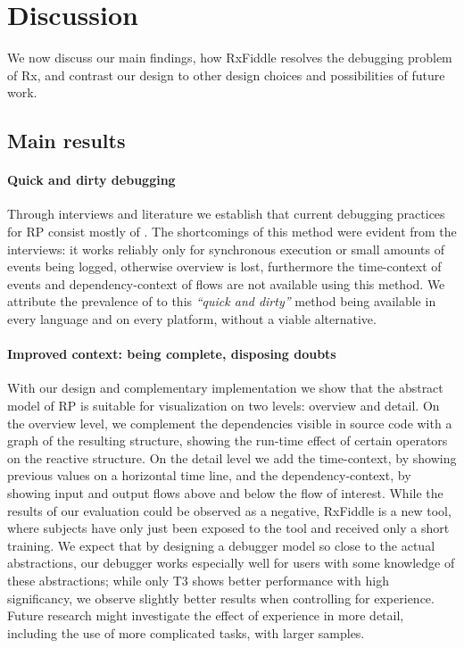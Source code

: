 \section{Discussion}
We now discuss our main findings, how RxFiddle resolves the debugging problem of Rx, and contrast our design to other design choices and possibilities of future work.

\subsection{Main results}
\paragraph{Quick and dirty debugging} Through interviews and literature we establish that current debugging practices for RP consist mostly of \printfdebugging{}. The shortcomings of this method were evident from the interviews: it works reliably only for synchronous execution or small amounts of events being logged, otherwise overview is lost, furthermore the time-context of events and dependency-context of flows are not available using this method. We attribute the prevalence of \printfdebugging{} to this \emph{``quick and dirty''} method being available in every language and on every platform, without a viable alternative.

\paragraph{Improved context: being complete, disposing doubts}
With our design and complementary implementation we show that the abstract model of RP is suitable for visualization on two levels: overview and detail. On the overview level, we complement the dependencies visible in source code with a graph of the resulting structure, showing the run-time effect of certain operators on the reactive structure. On the detail level we add the time-context, by showing previous values on a horizontal time line, and the dependency-context, by showing input and output flows above and below the flow of interest. 
While the results of our evaluation could be observed as a negative, RxFiddle is a new tool, where subjects have only just been exposed to the tool and received only a short training.
We expect that by designing a debugger model so close to the actual abstractions, our debugger works especially well for users with some knowledge of these abstractions; while only T3 shows better performance with high significancy, we observe slightly better results when controlling for experience. Future research might investigate the effect of experience in more detail, including the use of more complicated tasks, with larger samples.

